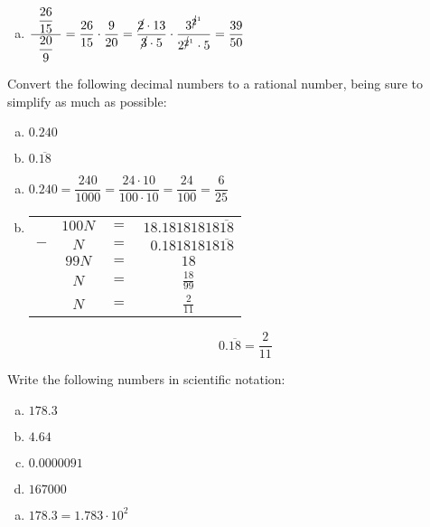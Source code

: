 \documentclass[12pt,letterpaper]{exam}
\begin{document}
\begin{questions}
\begin{enumerate}[(a)]
\item $\dfrac{\;\;\dfrac{26}{15}\;\;}{\;\;\dfrac{20}{9}\;\;}= \dfrac{26}{15} \cdot \dfrac{9}{20}= \dfrac{\cancel{2} \cdot 13}{\cancel{3} \cdot 5} \cdot \dfrac{3^{\cancel{2}^1}}{2^{\cancel{2}^1} \cdot 5}= \dfrac{39}{50}$
\end{enumerate}



\newpage
\question[10] Convert the following decimal numbers to a rational number, being sure to simplify as much as possible:
	\begin{enumerate}[(a)]
	\item $0.240$
	\item $0.\overline{18}$
	\end{enumerate} \pspace

\sol
\begin{enumerate}[(a)]
\item $0.240= \dfrac{240}{1000}= \dfrac{24 \cdot 10}{100 \cdot 10}= \dfrac{24}{100}= \dfrac{6}{25}$ \pspace

\item \phantom{.} \par
	\begin{table}[!ht]
	\centering\small
	\begin{tabular}{rccc}
	& $100N$ & $=$ & $18.18181818\overline{18}$ \\ 
	$-$ & $N$ & $=$ & $\phantom{1}0.18181818\overline{18}$ \\ \hline
	& $99N$ & $=$ & $18$ \\[0.1cm]
	& $N$ & $=$ & $\frac{18}{99}$ \\[0.1cm]
	& $N$ & $=$ & $\frac{2}{11}$
	\end{tabular}
	\end{table} \par

	\[
	0.\overline{18}= \dfrac{2}{11}
	\] 
\end{enumerate}



\newpage
\question[10] Write the following numbers in scientific notation:
	\begin{enumerate}[(a)]
	\item $178.3$
	\item $4.64$
	\item $0.0000091$
	\item $167000$
	\end{enumerate} \pspace

\sol
\begin{enumerate}[(a)]
\item $178.3= 1.783 \cdot 10^2$ \pspace


\end{enumerate}
\end{questions}
\end{document}
